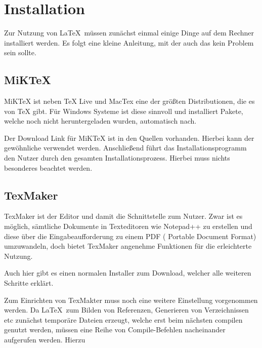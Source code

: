 \chapter{Installation}
\label{ch:installation}
Zur Nutzung von \LaTeX\ müssen zunächst einmal einige Dinge auf dem Rechner installiert werden. Es folgt eine kleine Anleitung, mit der auch das kein Problem sein sollte.

\section{MiKTeX}
MiKTeX ist neben TeX Live und MacTex eine der größten Distributionen, die es von TeX gibt. Für Windows Systeme ist diese sinnvoll und installiert Pakete, welche noch nicht heruntergeladen wurden, automatisch nach.

Der Download Link für MiKTeX ist in den Quellen vorhanden.\autocite[Vgl.][]{miktex} Hierbei kann der gewöhnliche verwendet werden. Anschließend führt das Installationsprogramm den Nutzer durch den gesamten Installationsprozess. Hierbei muss nichts besonderes beachtet werden.

\section{TexMaker}
TexMaker ist der Editor und damit die Schnittstelle zum Nutzer. Zwar ist es möglich, sämtliche Dokumente in Texteditoren wie Notepad++ zu erstellen und diese über die Eingabeaufforderung zu einem PDF ( Portable Document Format) umzuwandeln, doch bietet TexMaker angenehme Funktionen für die erleichterte Nutzung.

Auch hier gibt es einen normalen Installer zum Download, welcher alle weiteren Schritte erklärt.\autocite[Vgl.][]{texmaker}

Zum Einrichten von TexMakter muss noch eine weitere Einstellung vorgenommen werden. Da \LaTeX\ zum Bilden von Referenzen, Generieren von Verzeichnissen etc zunächst temporäre Dateien erzeugt, welche erst beim nächsten compilen genutzt werden, müssen eine Reihe von Compile-Befehlen nacheinander aufgerufen werden. Hierzu 